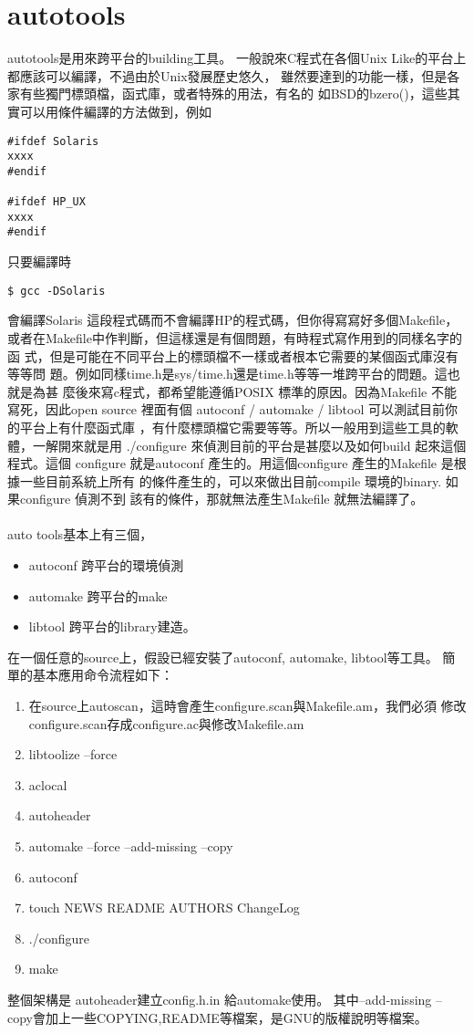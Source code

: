\section{autotools}
autotools是用來跨平台的building工具。
一般說來C程式在各個Unix Like的平台上都應該可以編譯，不過由於Unix發展歷史悠久，
雖然要達到的功能一樣，但是各家有些獨門標頭檔，函式庫，或者特殊的用法，有名的
如BSD的bzero()，這些其實可以用條件編譯的方法做到，例如
\begin{verbatim}
#ifdef Solaris
xxxx
#endif
    
#ifdef HP_UX
xxxx
#endif
\end{verbatim}
    只要編譯時
\begin{verbatim}
$ gcc -DSolaris
\end{verbatim}
會編譯Solaris 這段程式碼而不會編譯HP的程式碼，但你得寫寫好多個Makefile，
或者在Makefile中作判斷，但這樣還是有個問題，有時程式寫作用到的同樣名字的函
式，但是可能在不同平台上的標頭檔不一樣或者根本它需要的某個函式庫沒有等等問
題。例如同樣time.h是sys/time.h還是time.h等等一堆跨平台的問題。這也就是為甚
麼後來寫c程式，都希望能遵循POSIX 標準的原因。因為Makefile 不能寫死，因此open 
source 裡面有個 autoconf / automake / libtool 可以測試目前你的平台上有什麼函式庫
，有什麼標頭檔它需要等等。所以一般用到這些工具的軟體，一解開來就是用
./configure 來偵測目前的平台是甚麼以及如何build 起來這個程式。這個 configure
就是autoconf 產生的。用這個configure 產生的Makefile 是根據一些目前系統上所有
的條件產生的，可以來做出目前compile 環境的binary. 如果configure 偵測不到
該有的條件，那就無法產生Makefile 就無法編譯了。
\\\\
auto tools基本上有三個，
\begin{itemize}    
  \item autoconf 跨平台的環境偵測
  \item automake 跨平台的make
  \item libtool 跨平台的library建造。
\end{itemize}
在一個任意的source上，假設已經安裝了autoconf, automake, libtool等工具。
簡單的基本應用命令流程如下：
\begin{enumerate}
  \item 在source上autoscan，這時會產生configure.scan與Makefile.am，我們必須
        修改configure.scan存成configure.ac與修改Makefile.am
  \item libtoolize --force
  \item aclocal
  \item autoheader
  \item automake --force --add-missing --copy
  \item autoconf
  \item touch NEWS README AUTHORS ChangeLog
  \item ./configure
  \item make
\end{enumerate}
    整個架構是 autoheader建立config.h.in 給automake使用。
    其中--add-missing --copy會加上一些COPYING,README等檔案，是GNU的版權說明等檔案。
